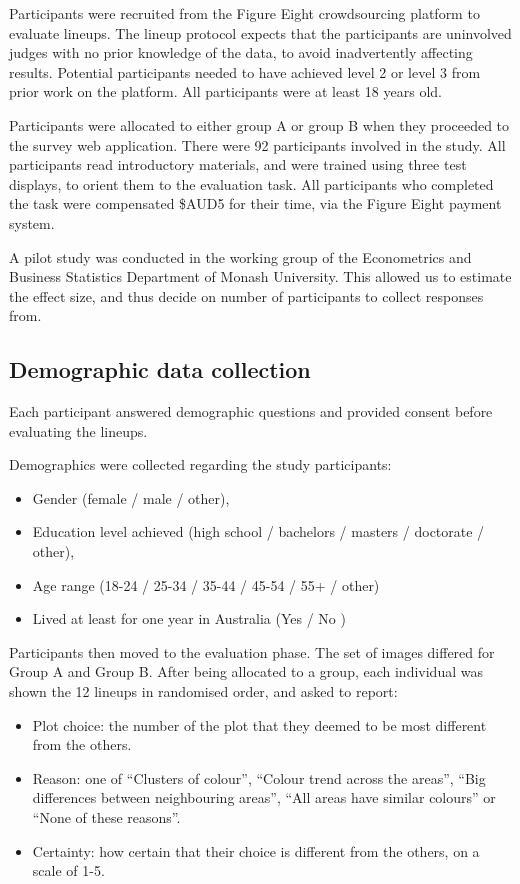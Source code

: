 \documentclass[
doublespace,
  times]{anzsauth}
\providecommand{\tightlist}{%
  \setlength{\itemsep}{0pt}\setlength{\parskip}{0pt}}
\begin{document}
Participants were recruited from the Figure Eight crowdsourcing platform
\citep{figeight} to evaluate lineups. The lineup protocol expects that
the participants are uninvolved judges with no prior knowledge of the
data, to avoid inadvertently affecting results. Potential participants
needed to have achieved level 2 or level 3 from prior work on the
platform. All participants were at least 18 years old.

Participants were allocated to either group A or group B when they
proceeded to the survey web application. There were 92 participants
involved in the study. All participants read introductory materials, and
were trained using three test displays, to orient them to the evaluation
task. All participants who completed the task were compensated \$AUD5
for their time, via the Figure Eight payment system.

A pilot study was conducted in the working group of the Econometrics and
Business Statistics Department of Monash University. This allowed us to
estimate the effect size, and thus decide on number of participants to
collect responses from.

\subsection{Demographic data
collection}\label{demographic-data-collection}

Each participant answered demographic questions and provided consent
before evaluating the lineups.

Demographics were collected regarding the study participants:

\begin{itemize}
\tightlist
\item
  Gender (female / male / other),
\item
  Education level achieved (high school / bachelors / masters /
  doctorate / other),
\item
  Age range (18-24 / 25-34 / 35-44 / 45-54 / 55+ / other)
\item
  Lived at least for one year in Australia (Yes / No )
\end{itemize}

Participants then moved to the evaluation phase. The set of images
differed for Group A and Group B. After being allocated to a group, each
individual was shown the 12 lineups in randomised order, and asked to
report:

\begin{itemize}
\tightlist
\item
  Plot choice: the number of the plot that they deemed to be most
  different from the others.
\item
  Reason: one of ``Clusters of colour'', ``Colour trend across the
  areas'', ``Big differences between neighbouring areas'', ``All areas
  have similar colours'' or ``None of these reasons''.
\item
  Certainty: how certain that their choice is different from the others,
  on a scale of 1-5.
\end{itemize}
\end{document}
